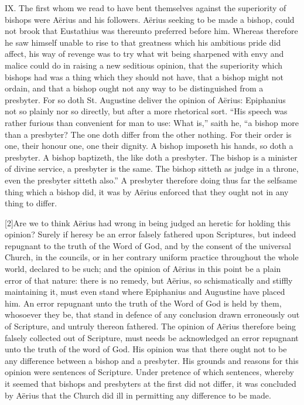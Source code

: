 IX. The first whom we read to have bent themselves against the superiority of bishops were Aërius and his followers. Aërius seeking to be made a bishop, could not brook that Eustathius was thereunto preferred before him. Whereas therefore he saw himself unable to rise to that greatness which his ambitious pride did affect, his way of revenge was to try what wit being sharpened with envy and malice could do in raising a new seditious opinion, that the superiority which bishops had was a thing which they should not have, that a bishop might not ordain, and that a bishop ought not any way to be distinguished from a presbyter. For so doth St. Augustine deliver the opinion of Aërius:  Epiphanius not so plainly nor so directly,
 but after a more rhetorical sort. “His speech was rather furious than convenient for man to use: What is,” saith he, “a bishop more than a presbyter? The one doth differ from the other nothing. For their order is one, their honour one, one their dignity. A bishop imposeth his hands, so doth a presbyter. A bishop baptizeth, the like doth a presbyter. The bishop is a minister of divine service, a presbyter is the same. The bishop sitteth as judge in a throne, even the presbyter sitteth also.” A presbyter therefore doing thus far the selfsame thing which a bishop did, it was by Aërius enforced that they ought not in any thing to differ.

[2]Are we to think Aërius had wrong in being judged an heretic for holding this opinion? Surely if heresy be an error falsely fathered upon Scriptures, but indeed repugnant to the truth of the Word of God, and by the consent of the universal Church, in the councils, or in her contrary uniform practice throughout the whole world, declared to be such; and the opinion of Aërius in this point be a plain error of that nature: there is no remedy, but Aërius, so schismatically and stiffly maintaining it, must even stand where Epiphanius and Augustine have placed him. An error repugnant unto the truth of the Word of God is held by them, whosoever they be, that stand in defence of any conclusion drawn erroneously out of Scripture, and untruly thereon fathered. The opinion of Aërius therefore being falsely collected out of Scripture, must needs be acknowledged an error repugnant unto the truth of the word of God. His opinion was that there ought not to be any difference between a bishop and a presbyter. His grounds and reasons for this opinion were sentences of Scripture. Under pretence of which sentences, whereby it seemed that bishops and presbyters at the first did  not differ,
 it was concluded by Aërius that the Church did ill in permitting any difference to be made.

